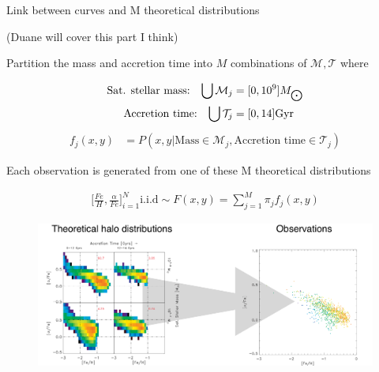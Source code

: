 \documentclass{beamer}
\newcommand{\afe}{\frac{\alpha}{Fe}}
\newcommand{\feh}{\frac{Fe}{H}}
\newcommand{\eqn}[1]{\begin{align*}
#1
\end{align*}}
\begin{document}
\begin{frame}{Link between curves and M theoretical distributions}
	
	(Duane will cover this part I think)
	
	
	Partition the mass and accretion time into $M$ combinations of $\mathcal{M},\mathcal{T}$ where
	
	\eqn{
		\text{Sat. stellar mass:} \hspace{3mm} \bigcup \mathcal{M}_j &= [0, 10^9] M_{\bigodot}  		\\
		\text{Accretion time:} \hspace{3mm} \bigcup \mathcal{T}_j &= [0, 14] \text{Gyr} 
	}
	\eqn{
		f_j(x,y) &= P(x,y|\text{Mass}\in \mathcal{M}_j, \text{Accretion time}\in \mathcal{T}_j)
	}

\end{frame}


\begin{frame}{Each observation is generated from one of these M theoretical distributions}
	
	\eqn{
		\Bigg[\feh,\afe\Bigg]_{i=1}^{N} \text{i.i.d} \sim F(x,y) = \sum^M_{j=1} \pi_j f_j(x,y)
	}	
		
	\begin{figure}
			\begin{center}
				\includegraphics[width=\textwidth]{denstoobs.pdf}
			\end{center}
	\end{figure}
\end{frame}
\end{document}
